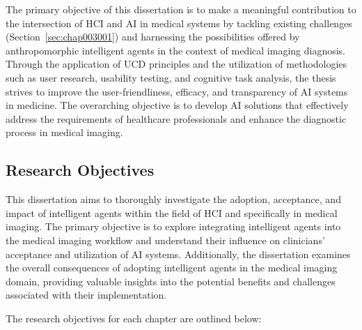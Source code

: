 
The primary objective of this dissertation is to make a meaningful contribution to the intersection of \ac{HCI} and \ac{AI} in medical systems by tackling existing challenges (Section~\ref{sec:chap003001}) and harnessing the possibilities offered by anthropomorphic intelligent agents in the context of medical imaging diagnosis.
Through the application of \ac{UCD} principles and the utilization of methodologies such as user research, usability testing, and cognitive task analysis, the thesis strives to improve the user-friendliness, efficacy, and transparency of \ac{AI} systems in medicine.
The overarching objective is to develop \ac{AI} solutions that effectively address the requirements of healthcare professionals and enhance the diagnostic process in medical imaging.

\subsection{Research Objectives}
\label{sec:chap001002002}

This dissertation aims to thoroughly investigate the adoption, acceptance, and impact of intelligent agents within the field of \ac{HCI} and specifically in medical imaging.
The primary objective is to explore integrating intelligent agents into the medical imaging workflow and understand their influence on clinicians' acceptance and utilization of \ac{AI} systems.
Additionally, the dissertation examines the overall consequences of adopting intelligent agents in the medical imaging domain, providing valuable insights into the potential benefits and challenges associated with their implementation.

\vspace{2.00mm}

\noindent
The research objectives for each chapter are outlined below:

\vspace{1.00mm}

